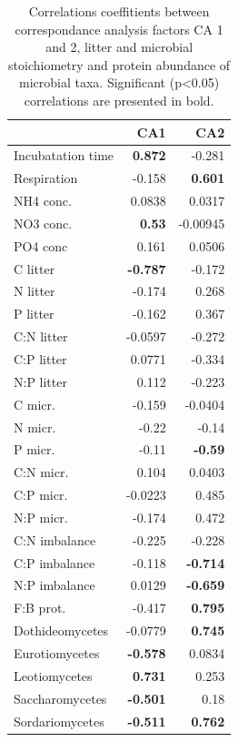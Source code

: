\documentclass[10pt]{article}
\begin{document}
\begin{flushleft}
\begin{table}[h!]
\begin{center}
\caption{Correlations coeffitients between correspondance analysis factors CA 1 and 2, litter and microbial stoichiometry and protein abundance of microbial taxa. Significant (p\textless 0.05) correlations are presented in bold.}
\label{catab}
{\small
\begin{tabular}{lrr}
  \hline
 & CA1 & CA2 \\ 
  \hline
Incubatation time & \textbf{ 0.872 } & -0.281 \\ 
  Respiration & -0.158 & \textbf{ 0.601 } \\ 
  NH4 conc. & 0.0838 & 0.0317 \\ 
  NO3 conc. & \textbf{ 0.53 } & -0.00945 \\ 
  PO4 conc & 0.161 & 0.0506 \\ 
  C litter & \textbf{ -0.787 } & -0.172 \\ 
  N litter & -0.174 & 0.268 \\ 
  P litter & -0.162 & 0.367 \\ 
  C:N litter & -0.0597 & -0.272 \\ 
  C:P litter & 0.0771 & -0.334 \\ 
  N:P litter & 0.112 & -0.223 \\ 
  C micr. & -0.159 & -0.0404 \\ 
  N micr. & -0.22 & -0.14 \\ 
  P micr. & -0.11 & \textbf{ -0.59 } \\ 
  C:N micr. & 0.104 & 0.0403 \\ 
  C:P micr. & -0.0223 & 0.485 \\ 
  N:P micr. & -0.174 & 0.472 \\ 
  C:N imbalance & -0.225 & -0.228 \\ 
  C:P imbalance & -0.118 & \textbf{ -0.714 } \\ 
  N:P imbalance & 0.0129 & \textbf{ -0.659 } \\ 
  F:B prot. & -0.417 & \textbf{ 0.795 } \\ 
  Dothideomycetes & -0.0779 & \textbf{ 0.745 } \\ 
  Eurotiomycetes & \textbf{ -0.578 } & 0.0834 \\ 
  Leotiomycetes & \textbf{ 0.731 } & 0.253 \\ 
  Saccharomycetes & \textbf{ -0.501 } & 0.18 \\ 
  Sordariomycetes & \textbf{ -0.511 } & \textbf{ 0.762 } \\ 

\end{tabular}}
\end{center}
\end{table}
\end{flushleft}
\end{document}
